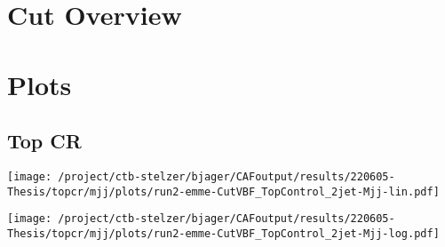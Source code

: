 \documentclass{article}
\begin{document}
\section[Cut Overview]{Cut Overview}

\centering


\section[Plots]{Plots}

\centering

\subsection[Top CR]{Top CR}

\centering

\texttt{[image: /project/ctb-stelzer/bjager/CAFoutput/results/220605-Thesis/topcr/mjj/plots/run2-emme-CutVBF\_TopControl\_2jet-Mjj-lin.pdf]}

\texttt{[image: /project/ctb-stelzer/bjager/CAFoutput/results/220605-Thesis/topcr/mjj/plots/run2-emme-CutVBF\_TopControl\_2jet-Mjj-log.pdf]}
\end{document}
